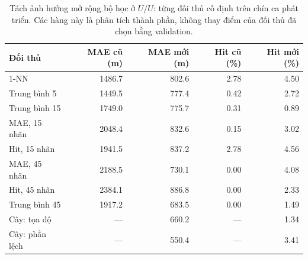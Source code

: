 \begin{table}[htbp]
\centering\small
\caption{Tách ảnh hưởng mở rộng bộ học ở $U/U$: từng đối thủ cố định trên chín ca phát triển. Các hàng này là phân tích thành phần, không thay điểm của đối thủ đã chọn bằng validation.}
\label{tab:expanded-shadow-data-effect}
\begin{tabular}{lrrrr}
\toprule
Đối thủ & MAE cũ (m) & MAE mới (m) & Hit cũ (\%) & Hit mới (\%)\\
\midrule
1-NN & 1486.7 & 802.6 & 2.78 & 4.50 \\
Trung bình 5 & 1449.5 & 777.4 & 0.42 & 2.72 \\
Trung bình 15 & 1749.0 & 775.7 & 0.31 & 0.89 \\
MAE, 15 nhãn & 2048.4 & 832.6 & 0.15 & 3.02 \\
Hit, 15 nhãn & 1941.5 & 837.2 & 2.78 & 4.56 \\
MAE, 45 nhãn & 2188.5 & 730.1 & 0.00 & 4.08 \\
Hit, 45 nhãn & 2384.1 & 886.8 & 0.00 & 2.33 \\
Trung bình 45 & 1917.2 & 683.5 & 0.00 & 1.49 \\
Cây: tọa độ & --- & 660.2 & --- & 1.34 \\
Cây: phần lệch & --- & 550.4 & --- & 3.41 \\
\bottomrule
\end{tabular}
\end{table}

